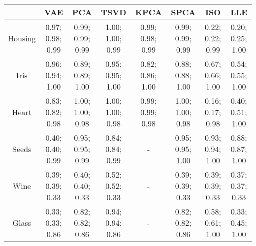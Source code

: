 \begin{tabular}{c|ccccccc}
          & \textbf{VAE}     & \textbf{PCA}     & \textbf{TSVD}    & \textbf{KPCA}    & \textbf{SPCA}    & \textbf{ISO}     & \textbf{LLE}     \\
   
  \hline
  
  Housing & 0.97; 0.98; 0.99 & 0.99; 0.99; 0.99 & 1.00; 1.00; 0.99 & 0.99; 0.98; 0.99 & 0.99; 0.99; 0.99 & 0.22; 0.22; 0.99 & 0.20; 0.25; 1.00 \\
  Iris    & 0.96; 0.94; 1.00 & 0.89; 0.89; 1.00 & 0.95; 0.95; 1.00 & 0.82; 0.86; 1.00 & 0.88; 0.88; 1.00 & 0.67; 0.66; 1.00 & 0.54; 0.55; 1.00 \\
  Heart   & 0.83; 0.82; 0.98 & 1.00; 1.00; 0.98 & 1.00; 1.00; 0.98 & 0.99; 0.99; 0.98 & 1.00; 1.00; 0.98 & 0.16; 0.17; 0.98 & 0.40; 0.51; 1.00 \\
  Seeds   & 0.40; 0.40; 0.99 & 0.95; 0.95; 0.99 & 0.84; 0.84; 0.99 & -                & 0.95; 0.95; 1.00 & 0.93; 0.94; 1.00 & 0.88; 0.87; 1.00 \\
  Wine    & 0.39; 0.39; 0.33 & 0.40; 0.40; 0.33 & 0.52; 0.52; 0.33 & -                & 0.39; 0.39; 0.33 & 0.39; 0.39; 0.33 & 0.37; 0.37; 0.33 \\
  Glass   & 0.33; 0.33; 0.86 & 0.82; 0.82; 0.86 & 0.94; 0.94; 0.86 & -                & 0.82; 0.82; 0.86 & 0.58; 0.61; 1.00 & 0.33; 0.45; 1.00 \\
\end{tabular}